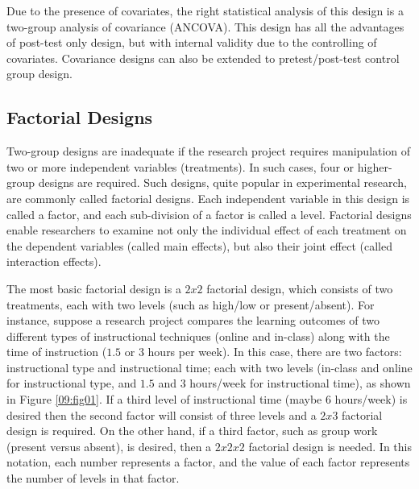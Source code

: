 Due to the presence of covariates, the right statistical analysis of this design is a two-group analysis of covariance (ANCOVA). This design has all the advantages of post-test only design, but with internal validity due to the controlling of covariates. Covariance designs can also be extended to pretest/post-test control group design.

\subsection{Factorial Designs}

Two-group designs are inadequate if the research project requires manipulation of two or more independent variables (treatments). In such cases, four or higher-group designs are required. Such designs, quite popular in experimental research, are commonly called factorial designs. Each independent variable in this design is called a factor, and each sub-division of a factor is called a level. Factorial designs enable researchers to examine not only the individual effect of each treatment on the dependent variables (called main effects), but also their joint effect (called interaction effects).

The most basic factorial design is a $ 2 x 2 $ factorial design, which consists of two treatments, each with two levels (such as high/low or present/absent). For instance, suppose a research project compares the learning outcomes of two different types of instructional techniques (online and in-class) along with the time of instruction ($ 1.5 $ or $ 3 $ hours per week). In this case, there are two factors: instructional type and instructional time; each with two levels (in-class and online for instructional type, and $ 1.5 $ and $ 3 $ hours/week for instructional time), as shown in Figure \ref{09:fig01}. If a third level of instructional time (maybe $ 6 $ hours/week) is desired then the second factor will consist of three levels and a $ 2 x 3 $ factorial design is required. On the other hand, if a third factor, such as group work (present versus absent), is desired, then a $ 2 x 2 x 2 $ factorial design is needed. In this notation, each number represents a factor, and the value of each factor represents the number of levels in that factor.


